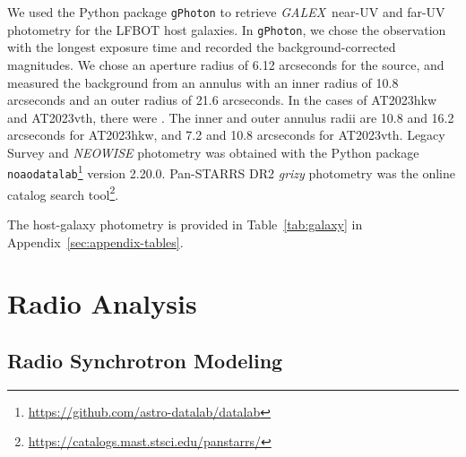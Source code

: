 \documentclass[twocolumn,twocolappendix, linenumbers, trackchanges]{aastex7}
\newcommand{\galex}{\emph{GALEX}}
\begin{document}
We used the Python package \texttt{gPhoton} \citep{gphoton} to retrieve \galex\ near-UV and far-UV photometry for the LFBOT host galaxies.  In \texttt{gPhoton}, we chose the observation with the longest exposure time and recorded the background-corrected magnitudes.  We chose an aperture radius of 6.12 arcseconds for the source, and measured the background from an annulus with an inner radius of 10.8 arcseconds and an outer radius of 21.6 arcseconds.    In the cases of AT2023hkw and AT2023vth, there were .  The inner and outer annulus radii are 10.8 and 16.2 arcseconds for AT2023hkw, and 7.2 and 10.8 arcseconds for AT2023vth.  Legacy Survey and {\it NEOWISE} photometry was obtained with the Python package \texttt{noaodatalab}\footnote{\href{https://github.com/astro-datalab/datalab}{https://github.com/astro-datalab/datalab}} version 2.20.0.  Pan-STARRS DR2 {\em grizy} photometry was  the online catalog search tool\footnote{\href{https://catalogs.mast.stsci.edu/panstarrs/}{https://catalogs.mast.stsci.edu/panstarrs/}}.

The host-galaxy photometry is provided in Table~\ref{tab:galaxy} in Appendix~\ref{sec:appendix-tables}.






\section{Radio Analysis}
\label{sec:radio-analysis}

\subsection{Radio Synchrotron Modeling}
\label{sec:synchro}
\end{document}
